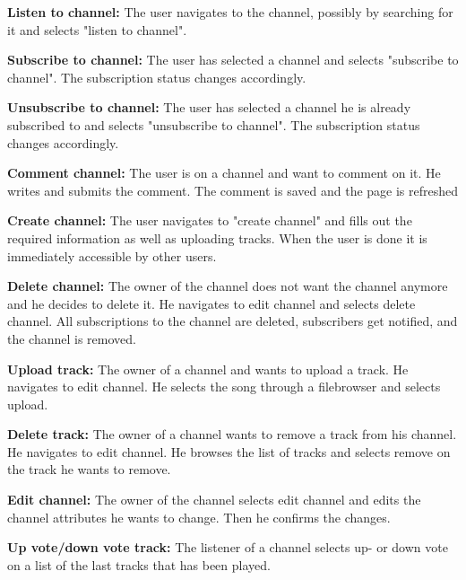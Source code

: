 \documentclass[a4paper,11pt,report]{article}
\begin{document}
\textbf{Listen to channel:}
The user navigates to the channel, possibly by searching for it and selects "listen to channel".

\textbf{Subscribe to channel:}
The user has selected a channel and selects "subscribe to channel". The subscription status changes accordingly.

\textbf{Unsubscribe to channel:}
The user has selected a channel he is already subscribed to and selects "unsubscribe to channel". The subscription status changes accordingly.

\textbf{Comment channel:}
The user is on a channel and want to comment on it. He writes and submits the comment. The comment is saved and the page is refreshed

\textbf{Create channel:}
The user navigates to "create channel" and fills out the required information as well as uploading tracks. When the user is done it is immediately accessible by other users.

\textbf{Delete channel:}
The owner of the channel does not want the channel anymore and he decides to delete it. He navigates to edit channel and selects delete channel. All subscriptions to the channel are deleted, subscribers get notified, and the channel is removed.

\textbf{Upload track:}
The owner of a channel and wants to upload a track. He navigates to edit channel. He selects the song through a filebrowser and selects upload.

\textbf{Delete track:}
The owner of a channel wants to remove a track from his channel. He navigates to edit channel. He browses the list of tracks and selects remove on the track he wants to remove.

\textbf{Edit channel:}
The owner of the channel selects edit channel and edits the channel attributes he wants to change. Then he confirms the changes.

\textbf{Up vote/down vote track:}
The listener of a channel selects up- or down vote on a list of the last tracks that has been played.
\end{document}
